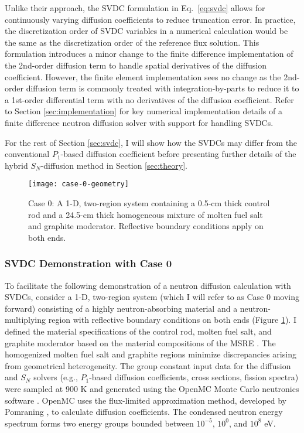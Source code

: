 Unlike their approach, the \gls{SVDC} formulation in Eq.\ \ref{eq:svdc} allows for continuously
varying diffusion coefficients to reduce truncation error. In practice, the discretization order of
\gls{SVDC} variables in a numerical calculation would be the same as the discretization order of
the reference flux solution. This formulation introduces a minor change to the finite difference
implementation of the 2nd-order diffusion term to handle spatial derivatives of the
diffusion coefficient. However, the finite element implementation sees no change as the 2nd-order
diffusion term is commonly treated with integration-by-parts to reduce it to a 1st-order
differential term with no derivatives of the diffusion coefficient. Refer to Section
\ref{sec:implementation} for key numerical implementation details of a finite difference neutron
diffusion solver with support for handling \glspl{SVDC}.

For the rest of Section \ref{sec:svdc}, I will show how the \glspl{SVDC} may differ from the
conventional $P_1$-based diffusion coefficient before presenting further details of the hybrid
$S_N$-diffusion method in Section \ref{sec:theory}.

\begin{figure}[htb!]
  \centering
  \texttt{[image: case-0-geometry]}
  \caption{Case 0: A 1-D, two-region system containing a 0.5-cm thick control rod and a 24.5-cm
    thick homogeneous mixture of molten fuel salt and graphite moderator. Reflective boundary
    conditions apply on both ends.}
  \label{fig:case-0-geom}
\end{figure}

\subsubsection{\gls{SVDC} Demonstration with Case 0}

To facilitate the following demonstration of a neutron diffusion calculation with \glspl{SVDC},
consider a 1-D, two-region system (which I will refer to as Case 0 moving forward) consisting of a
highly neutron-absorbing material and a
neutron-multiplying region with reflective boundary conditions on both ends (Figure
\ref{fig:case-0-geom}). I defined the material specifications of the control rod, molten fuel salt,
and graphite moderator based on the material compositions of the \gls{MSRE}
\cite{robertson_msre_1965}. The
homogenized molten fuel salt and graphite regions minimize discrepancies arising from geometrical
heterogeneity. The group constant input data for the diffusion and $S_N$ solvers (e.g., $P_1$-based
diffusion coefficients, cross sections, fission spectra) were sampled at 900 K and generated using
the OpenMC Monte Carlo neutronics software \cite{romano_openmc:_2015}. OpenMC uses the flux-limited
approximation method, developed by Pomraning \cite{pomraning_flux-limited_1984}, to calculate
diffusion coefficients. The condensed
neutron energy spectrum forms two energy groups bounded between $10^{-5}$, $10^0$, and $10^8$ eV.

